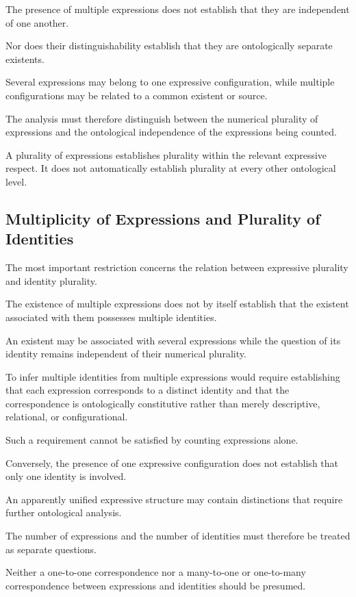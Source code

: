 The presence of multiple expressions does not
establish that they are independent of one another.

Nor does their distinguishability establish
that they are ontologically separate existents.

Several expressions may belong to one expressive
configuration, while multiple configurations
may be related to a common existent or source.

The analysis must therefore distinguish between
the numerical plurality of expressions and
the ontological independence of the expressions
being counted.

A plurality of expressions establishes plurality
within the relevant expressive respect. It does
not automatically establish plurality at every
other ontological level.

\subsection{Multiplicity of Expressions and Plurality of Identities}

The most important restriction concerns the
relation between expressive plurality and
identity plurality.

The existence of multiple expressions does not
by itself establish that the existent associated
with them possesses multiple identities.

An existent may be associated with several
expressions while the question of its identity
remains independent of their numerical plurality.

To infer multiple identities from multiple
expressions would require establishing that
each expression corresponds to a distinct
identity and that the correspondence is
ontologically constitutive rather than merely
descriptive, relational, or configurational.

Such a requirement cannot be satisfied by
counting expressions alone.

Conversely, the presence of one expressive
configuration does not establish that only
one identity is involved.

An apparently unified expressive structure
may contain distinctions that require further
ontological analysis.

The number of expressions and the number
of identities must therefore be treated as
separate questions.

Neither a one-to-one correspondence nor
a many-to-one or one-to-many correspondence
between expressions and identities should
be presumed.

